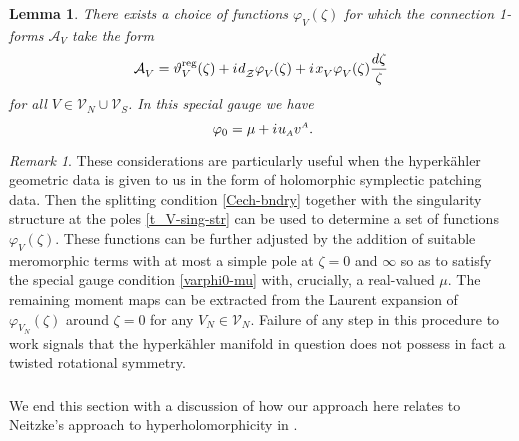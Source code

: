 \documentclass[11pt]{amsart}
\newtheorem{lemma}[theorem]{Lemma}
\theoremstyle{remark}
\newtheorem*{remark}{Remark}
\theoremstyle{remark}
\theoremstyle{definition}
\theoremstyle{definition}
\theoremstyle{definition}
\newcommand{\0}{{\scriptstyle 0'}} %
\newcommand{\1}{{\scriptstyle 1'}}
\newcommand{\A}{{\scriptscriptstyle A}} %
\newcommand{\pt}{\hspace{1pt}} %
\newcommand{\hp}{\hspace{0.5pt}} %
\begin{document}
\begin{lemma} \label{A_V-sp-gauge}
There exists a choice of functions $\varphi_V(\zeta)$ for which the connection 1-forms $\mathcal{A}_V$ take the form
\begin{equation} \label{A_V-manif_mero}
\mathcal{A}^{\phantom{g}}_V = \vartheta^{\textup{reg}}_V(\zeta) + i\hp d^{\phantom{g}}_{\mathcal{Z}}\varphi^{\phantom{g}}_V(\zeta) + i \pt x^{\phantom{g}}_V\varphi^{\phantom{g}}_V(\zeta) \frac{d\zeta}{\zeta}
\end{equation}
for all $V \in \mathscr{V}_N \cup \mathscr{V}_S$. In this special gauge we have
\begin{equation} \label{varphi0-mu}
\varphi_0 = \mu + i \hp u_{\A}v^{\A} \rlap{.}
\end{equation}
\end{lemma}

\begin{remark}
These considerations are particularly useful when the hyperk\"ahler geometric data is given to us in the form of holomorphic symplectic patching data. Then the splitting condition \eqref{Cech-bndry} together with the singularity structure at the poles \eqref{t_V-sing-str} can be used to determine a set of functions $\varphi_V(\zeta)$. These functions can be further adjusted by the addition of suitable meromorphic terms with at most a simple pole at $\zeta =0$ and $\infty$ so as to satisfy the special gauge condition \eqref{varphi0-mu} with, crucially, a real-valued $\mu$. The remaining moment maps can be extracted from the Laurent expansion of $\varphi_{V_N}(\zeta)$ around $\zeta = 0$ for any $V_N \in \mathscr{V}_N$. Failure of any step in this procedure to work signals that the hyperk\"ahler manifold in question does not possess in fact a twisted rotational symmetry. 
\end{remark}



\subsubsection{} 

We end this section with a discussion of how our approach here relates to Neitzke's approach to hyperholomorphicity in \cite{Neitzke:2011za}. 
\end{document}
